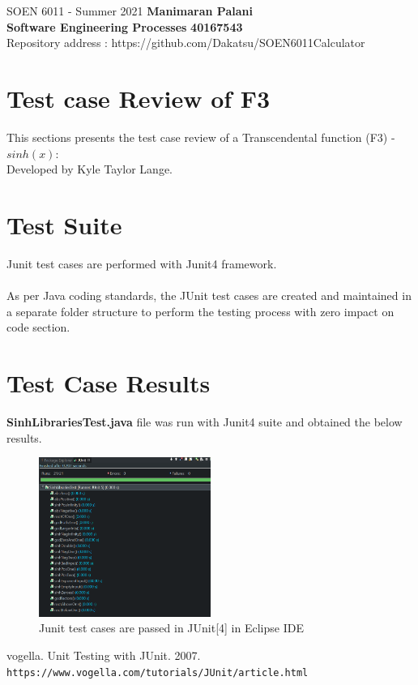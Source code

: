 \documentclass[letterpaper, 11pt]{report}
\begin{document}
\pagebreak

\section*{}
\normalsize {SOEN 6011 - Summer 2021} \hfill \textbf{Manimaran Palani} \\
\textbf{ Software Engineering Processes}  \hfill \textbf{40167543} \\
\hfill Repository address : https://github.com/Dakatsu/SOEN6011Calculator
\\
\section*{Test case Review of F3}
This sections presents the test case review of a  Transcendental function (F3) - $sinh(x)$: \\Developed by Kyle Taylor Lange.
\section*{Test Suite}
Junit test cases\cite{vogella} are performed with Junit4 framework.
\\\\
As per Java coding standards, the JUnit test cases are created and maintained in a separate folder structure to perform the testing process with zero impact on code section.
\section*{Test Case Results}
\textbf{SinhLibrariesTest.java} file was run with Junit4 suite and obtained the below results.
\\
\begin{figure}[htb]
\includegraphics[width=0.5\textwidth]{TestCases_Review_Results_F3}
\centering
\caption{Junit test cases are passed in JUnit[4] in Eclipse IDE}
\end{figure}
\begin{thebibliography}{}
vogella. Unit Testing with JUnit. 2007. 
\\\texttt{https://www.vogella.com/tutorials/JUnit/article.html}
\end{thebibliography}
\end{document}
